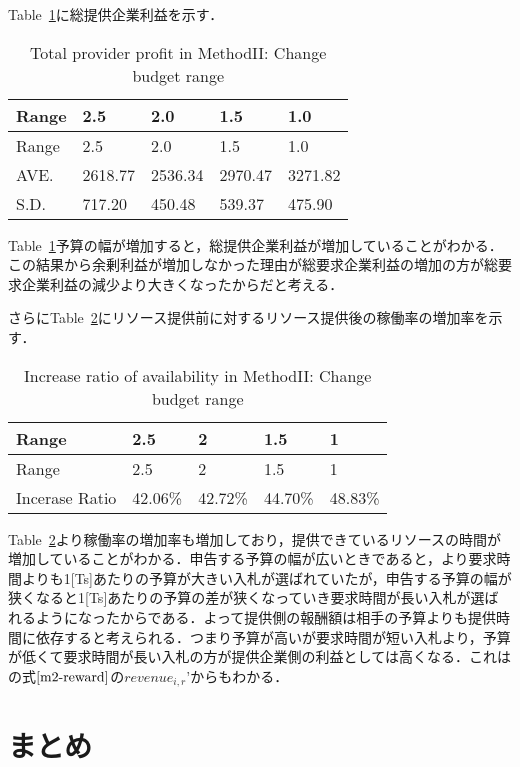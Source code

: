Table~\ref{tbl:m2-5-total-provider-profit}に総提供企業利益を示す．

\hypertarget{tbl:m2-5-total-provider-profit}{}
\begin{longtable}[H]{@{}lllll@{}}
\caption{\label{tbl:m2-5-total-provider-profit}Total provider profit in
MethodII: Change budget range}\tabularnewline
\toprule
Range & 2.5 & 2.0 & 1.5 & 1.0\tabularnewline
\midrule
\endfirsthead
\toprule
Range & 2.5 & 2.0 & 1.5 & 1.0\tabularnewline
\midrule
\endhead
AVE. & 2618.77 & 2536.34 & 2970.47 & 3271.82\tabularnewline
S.D. & 717.20 & 450.48 & 539.37 & 475.90\tabularnewline
\bottomrule
\end{longtable}

Table~\ref{tbl:m2-5-total-provider-profit}予算の幅が増加すると，総提供企業利益が増加していることがわかる．この結果から余剰利益が増加しなかった理由が総要求企業利益の増加の方が総要求企業利益の減少より大きくなったからだと考える．

さらにTable~\ref{tbl:m2-5-availability}にリソース提供前に対するリソース提供後の稼働率の増加率を示す．

\hypertarget{tbl:m2-5-availability}{}
\begin{longtable}[H]{@{}lllll@{}}
\caption{\label{tbl:m2-5-availability}Increase ratio of availability in
MethodII: Change budget range}\tabularnewline
\toprule
Range & 2.5 & 2 & 1.5 & 1\tabularnewline
\midrule
\endfirsthead
\toprule
Range & 2.5 & 2 & 1.5 & 1\tabularnewline
\midrule
\endhead
Incerase Ratio & 42.06\% & 42.72\% & 44.70\% & 48.83\%\tabularnewline
\bottomrule
\end{longtable}

Table~\ref{tbl:m2-5-availability}より稼働率の増加率も増加しており，提供できているリソースの時間が増加していることがわかる．申告する予算の幅が広いときであると，より要求時間よりも1{[}Ts{]}あたりの予算が大きい入札が選ばれていたが，申告する予算の幅が狭くなると1{[}Ts{]}あたりの予算の差が狭くなっていき要求時間が長い入札が選ばれるようになったからである．よって提供側の報酬額は相手の予算よりも提供時間に依存すると考えられる．つまり予算が高いが要求時間が短い入札より，予算が低くて要求時間が長い入札の方が提供企業側の利益としては高くなる．これはの式\(\eqref{m2-reward}\)の\(revenue_{i,r}’\)からもわかる．

\hypertarget{ux307eux3068ux3081-1}{%
\section{まとめ}\label{ux307eux3068ux3081-1}}

